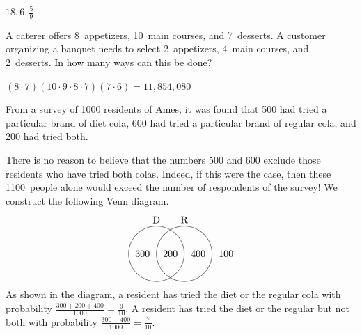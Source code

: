 \documentclass[answers,12pt]{exam}
\begin{document}
\begin{questions}
\begin{solution} $18,6,\frac{5}{9}$\end{solution}

\question A caterer offers 8~appetizers,
10~main courses, and 7~desserts. A customer organizing
a banquet needs to select 2~appetizers, 4~main courses,
and 2~desserts. In how many ways can this be done?
\begin{solution} $\left(8\cdot 7\right)\left(10\cdot
9\cdot 8\cdot 7\right)\left(7\cdot 6\right)=11,854,080$
\end{solution}

\question From a survey of 1000 residents of Ames, it was found that
500 had tried a particular brand of diet cola, 600 had tried
a particular brand of regular cola, and 200 had tried both.
\begin{solution}
There is no reason to believe that the numbers 500 and 600
exclude those residents who have tried both colas. Indeed,
if this were the case, then these 1100~people alone would exceed
the number of respondents of the survey! We construct the following
Venn diagram.
\[\begin{xy}<.5cm,0cm>:
(-1,2)*+!D{\text{D}};
(1,2)*+!D{\text{R}};
(-1,0)*\cir<1cm>{};
(1,0)*\cir<1cm>{};
(0,0)*{200};
(-2,0)*{300};
(2,0)*{400};
(4,0)*{100};
\end{xy}\]
As shown in the diagram, a resident has tried
the diet or the regular cola with probability
$\frac{300+200+400}{1000}=\frac{9}{10}$.
A resident has tried the diet or the regular
but not both with probability
$\frac{300+400}{1000}=\frac{7}{10}$.
\end{solution}


\end{questions}
\end{document}
